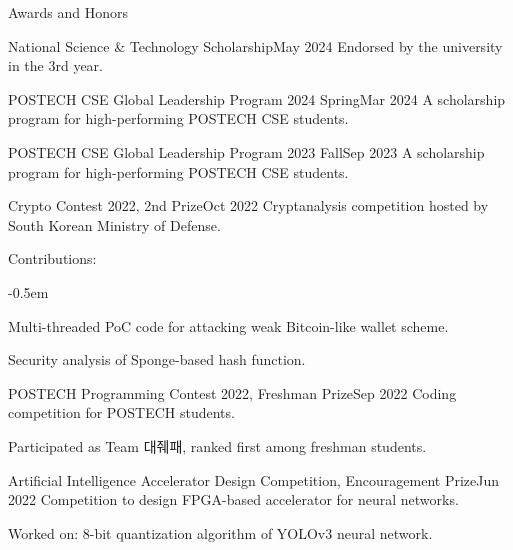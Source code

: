 \documentclass{resume}
\begin{document}
\begin{res-section}{Awards and Honors}
  \begin{res-subsection}{National Science \& Technology Scholarship}{May 2024}
    Endorsed by the university in the 3rd year.
  \end{res-subsection}

  \begin{res-subsection}{POSTECH CSE Global Leadership Program 2024 Spring}{Mar 2024}
    A scholarship program for high-performing POSTECH CSE students.
  \end{res-subsection}

  \begin{res-subsection}{POSTECH CSE Global Leadership Program 2023 Fall}{Sep 2023}
    A scholarship program for high-performing POSTECH CSE students.
  \end{res-subsection}

  \begin{res-subsection}{Crypto Contest 2022, 2nd Prize}{Oct 2022}
    Cryptanalysis competition hosted by South Korean Ministry of Defense.

    \item Contributions:
    \vspace{-0.5em}
    \begin{list}{--}{}
      \itemsep -0.5em
      \item Multi-threaded PoC code for attacking weak Bitcoin-like wallet scheme.
      \item Security analysis of Sponge-based hash function.
    \end{list}
  \end{res-subsection}

  \begin{res-subsection}{POSTECH Programming Contest 2022, Freshman Prize}{Sep 2022}
    Coding competition for POSTECH students.

    \item Participated as Team 대줴패, ranked first among freshman students.
  \end{res-subsection}

  \begin{res-subsection}{Artificial Intelligence Accelerator Design Competition, Encouragement Prize}{Jun 2022}
    Competition to design FPGA-based accelerator for neural networks.

    \item Worked on: 8-bit quantization algorithm of YOLOv3 neural network.
  \end{res-subsection}
\end{res-section}
\end{document}

